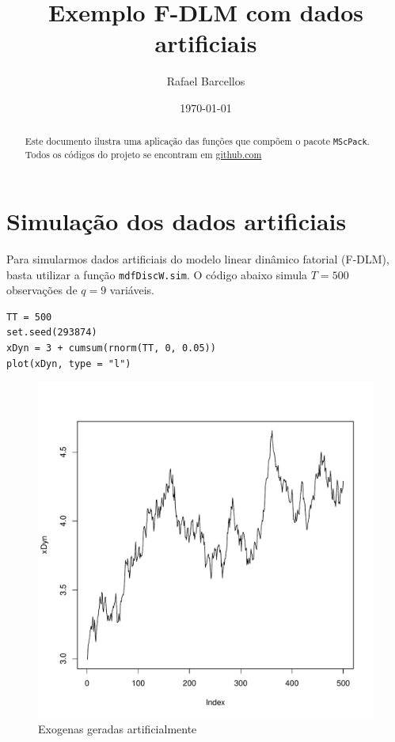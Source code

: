 \documentclass{article}\usepackage[]{graphicx}\usepackage[]{color}
\title{Exemplo F-DLM com dados artificiais}
\author{Rafael Barcellos}
\date{\today}
\makeatletter
\def\maxwidth{ %
  \ifdim\Gin@nat@width>\linewidth
    \linewidth
  \else
    \Gin@nat@width
  \fi
}
\newenvironment{kframe}{%
 \def\at@end@of@kframe{}%
 \ifinner\ifhmode%
  \def\at@end@of@kframe{\end{minipage}}%
  \begin{minipage}{\columnwidth}%
 \fi\fi%
 \def\FrameCommand##1{\hskip\@totalleftmargin \hskip-\fboxsep
 \colorbox{shadecolor}{##1}\hskip-\fboxsep
     \hskip-\linewidth \hskip-\@totalleftmargin \hskip\columnwidth}%
 \MakeFramed {\advance\hsize-\width
   \@totalleftmargin\z@ \linewidth\hsize
   \@setminipage}}%
 {\par\unskip\endMakeFramed%
 \at@end@of@kframe}
\newenvironment{knitrout}{}{} %
\makeatother
\begin{document}
\maketitle

\begin{abstract}
Este documento ilustra uma aplicação das funções que compõem o pacote \texttt{MScPack}. Todos os códigos do projeto se encontram em \href{https://github.com/rambs/MScPack}{github.com}
\end{abstract}

\section{Simulação dos dados artificiais}
Para simularmos dados artificiais do modelo linear dinâmico fatorial (F-DLM), basta utilizar a função \texttt{mdfDiscW.sim}. O código abaixo simula $T = 500$ observações de $q = 9$ variáveis.
\begin{knitrout}
\color{fgcolor}\begin{kframe}
\begin{verbatim}
TT = 500
set.seed(293874)
xDyn = 3 + cumsum(rnorm(TT, 0, 0.05))
plot(xDyn, type = "l")
\end{verbatim}
\end{kframe}\begin{figure}[]

\includegraphics[width=\maxwidth]{figure/simExog} \caption[Exogenas geradas artificialmente]{Exogenas geradas artificialmente\label{fig:simExog}}
\end{figure}


\end{knitrout}
\end{document}
